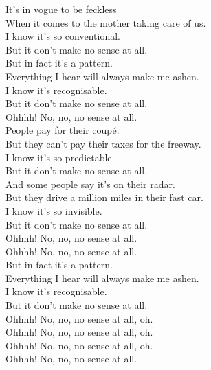 
\label{album:paper-mache-dream-balloon}




It's in vogue to be feckless \\
When it comes to the mother taking care of us. \\
I know it's so conventional. \\
But it don't make no sense at all. \\

But in fact it's a pattern. \\
Everything I hear will always make me ashen. \\
I know it's recognisable. \\
But it don't make no sense at all. \\

Ohhhh! No, no, no sense at all. \\

People pay for their coupé. \\
But they can't pay their taxes for the freeway. \\
I know it's so predictable. \\
But it don't make no sense at all. \\

And some people say it's on their radar. \\
But they drive a million miles in their fast car. \\
I know it's so invisible. \\
But it don't make no sense at all. \\

Ohhhh! No, no, no sense at all. \\
Ohhhh! No, no, no sense at all. \\

But in fact it's a pattern. \\
Everything I hear will always make me ashen. \\
I know it's recognisable. \\
But it don't make no sense at all. \\

Ohhhh! No, no, no sense at all, oh. \\
Ohhhh! No, no, no sense at all, oh. \\
Ohhhh! No, no, no sense at all, oh. \\
Ohhhh! No, no, no sense at all. \\

